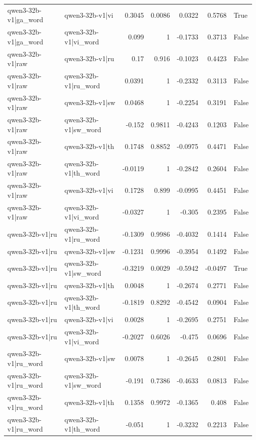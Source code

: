 \begin{table}
\begin{tabular}{l l r r r r l}
qwen3-32b-v1|ga_word & qwen3-32b-v1|vi & 0.3045 & 0.0086 & 0.0322 & 0.5768 & True \\
qwen3-32b-v1|ga_word & qwen3-32b-v1|vi_word & 0.099 & 1 & -0.1733 & 0.3713 & False \\
qwen3-32b-v1|raw & qwen3-32b-v1|ru & 0.17 & 0.916 & -0.1023 & 0.4423 & False \\
qwen3-32b-v1|raw & qwen3-32b-v1|ru_word & 0.0391 & 1 & -0.2332 & 0.3113 & False \\
qwen3-32b-v1|raw & qwen3-32b-v1|sw & 0.0468 & 1 & -0.2254 & 0.3191 & False \\
qwen3-32b-v1|raw & qwen3-32b-v1|sw_word & -0.152 & 0.9811 & -0.4243 & 0.1203 & False \\
qwen3-32b-v1|raw & qwen3-32b-v1|th & 0.1748 & 0.8852 & -0.0975 & 0.4471 & False \\
qwen3-32b-v1|raw & qwen3-32b-v1|th_word & -0.0119 & 1 & -0.2842 & 0.2604 & False \\
qwen3-32b-v1|raw & qwen3-32b-v1|vi & 0.1728 & 0.899 & -0.0995 & 0.4451 & False \\
qwen3-32b-v1|raw & qwen3-32b-v1|vi_word & -0.0327 & 1 & -0.305 & 0.2395 & False \\
qwen3-32b-v1|ru & qwen3-32b-v1|ru_word & -0.1309 & 0.9986 & -0.4032 & 0.1414 & False \\
qwen3-32b-v1|ru & qwen3-32b-v1|sw & -0.1231 & 0.9996 & -0.3954 & 0.1492 & False \\
qwen3-32b-v1|ru & qwen3-32b-v1|sw_word & -0.3219 & 0.0029 & -0.5942 & -0.0497 & True \\
qwen3-32b-v1|ru & qwen3-32b-v1|th & 0.0048 & 1 & -0.2674 & 0.2771 & False \\
qwen3-32b-v1|ru & qwen3-32b-v1|th_word & -0.1819 & 0.8292 & -0.4542 & 0.0904 & False \\
qwen3-32b-v1|ru & qwen3-32b-v1|vi & 0.0028 & 1 & -0.2695 & 0.2751 & False \\
qwen3-32b-v1|ru & qwen3-32b-v1|vi_word & -0.2027 & 0.6026 & -0.475 & 0.0696 & False \\
qwen3-32b-v1|ru_word & qwen3-32b-v1|sw & 0.0078 & 1 & -0.2645 & 0.2801 & False \\
qwen3-32b-v1|ru_word & qwen3-32b-v1|sw_word & -0.191 & 0.7386 & -0.4633 & 0.0813 & False \\
qwen3-32b-v1|ru_word & qwen3-32b-v1|th & 0.1358 & 0.9972 & -0.1365 & 0.408 & False \\
qwen3-32b-v1|ru_word & qwen3-32b-v1|th_word & -0.051 & 1 & -0.3232 & 0.2213 & False \\

\end{tabular}
\end{table}
